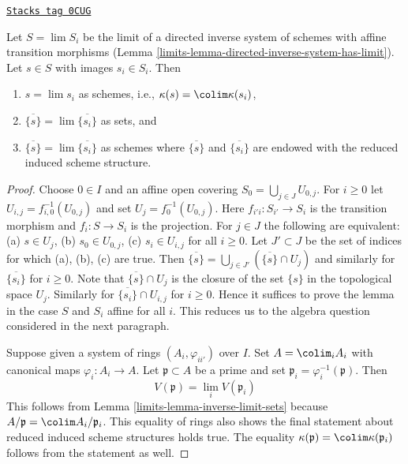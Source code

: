 \begin{lemma}
\label{limits-lemma-inverse-limit-irreducibles}
\href{https://stacks.math.columbia.edu/tag/0CUG}{\texttt{Stacks tag 0CUG}}

Let $S = \lim S_i$ be the limit of a directed inverse system
of schemes with affine transition morphisms
(Lemma \ref{limits-lemma-directed-inverse-system-has-limit}).
Let $s \in S$ with images $s_i \in S_i$.
Then
\begin{enumerate}
\item $s = \lim s_i$ as schemes, i.e., $\kappa(s) = \colim \kappa(s_i)$,
\item $\overline{\{s\}} = \lim \overline{\{s_i\}}$ as sets, and
\item $\overline{\{s\}} = \lim \overline{\{s_i\}}$ as schemes
where $\overline{\{s\}}$ and $\overline{\{s_i\}}$ are
endowed with the reduced induced scheme structure.
\end{enumerate}
\end{lemma}

\begin{proof}

Choose $0 \in I$ and an affine open covering
$S_0 = \bigcup_{j \in J} U_{0, j}$.
For $i \geq 0$ let $U_{i, j} = f_{i, 0}^{-1}(U_{0, j})$
and set $U_j = f_0^{-1}(U_{0, j})$.
Here $f_{i'i} : S_{i'} \to S_i$ is the transition morphism
and $f_i : S \to S_i$ is the projection.
For $j \in J$ the following are equivalent:
(a) $s \in U_j$, (b) $s_0 \in U_{0, j}$,
(c) $s_i \in U_{i, j}$ for all $i \geq 0$.
Let $J' \subset J$ be the set of indices for which (a), (b), (c) are true.
Then $\overline{\{s\}} = \bigcup_{j \in J'} (\overline{\{s\}} \cap U_j)$
and similarly for $\overline{\{s_i\}}$ for $i \geq 0$.
Note that $\overline{\{s\}} \cap U_j$ is the closure of the
set $\{s\}$ in the topological space $U_j$. Similarly for
$\overline{\{s_i\}} \cap U_{i, j}$ for $i \geq 0$.
Hence it suffices to prove the lemma in the case
$S$ and $S_i$ affine for all $i$. This reduces us to the
algebra question considered in the next paragraph.

\medskip\noindent
Suppose given a system of rings $(A_i, \varphi_{ii'})$
over $I$. Set $A = \colim_i A_i$ with canonical maps
$\varphi_i : A_i \to A$. Let $\mathfrak p \subset A$ be a
prime and set $\mathfrak p_i = \varphi_i^{-1}(\mathfrak p)$.
Then
$$
V(\mathfrak p) = \lim_i V(\mathfrak p_i)
$$
This follows from Lemma \ref{limits-lemma-inverse-limit-sets}
because $A/\mathfrak p = \colim A_i/\mathfrak p_i$.
This equality of rings also shows the final statement
about reduced induced scheme structures holds true.
The equality $\kappa(\mathfrak p) = \colim \kappa(\mathfrak p_i)$
follows from the statement as well.
\end{proof}

